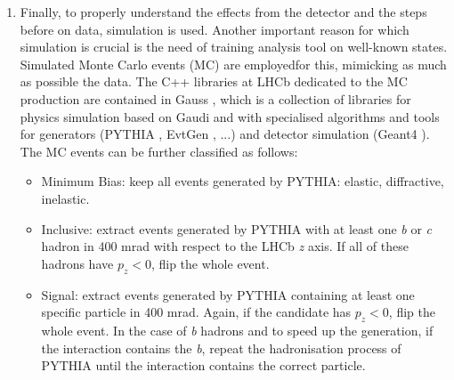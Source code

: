 \begin{enumerate}
\item Finally, to properly understand the effects from the detector and the steps before on data, simulation is used. Another important reason for which simulation is crucial is the need of training analysis tool on well-known states.
Simulated Monte Carlo events (MC) are employedfor this, mimicking as much as possible the data. The C++ libraries at LHCb dedicated to the MC production
are contained in Gauss , which is a collection of libraries for physics simulation based on Gaudi and with specialised algorithms and tools for generators (PYTHIA , EvtGen , ...) and detector simulation (Geant4 ).
The MC events can be further classified as follows:
\begin{itemize}
\item Minimum Bias: keep all events generated by PYTHIA: elastic, diffractive, inelastic.
\item Inclusive: extract events generated by PYTHIA with at least one \textit{b} or \textit{c} hadron in 400 mrad with respect to the LHCb \textit{z} axis. If all of these hadrons have $p_z < 0$, flip the whole event.
\item Signal: extract events generated by PYTHIA containing at least one specific particle in 400 mrad. Again, if the candidate has $p_z < 0$, flip the whole event. In the case of \textit{b} hadrons and to speed up the generation, if the interaction contains the \textit{b}, repeat the hadronisation process of PYTHIA until the interaction contains the correct particle.
\end{itemize}
\end{enumerate}


		
